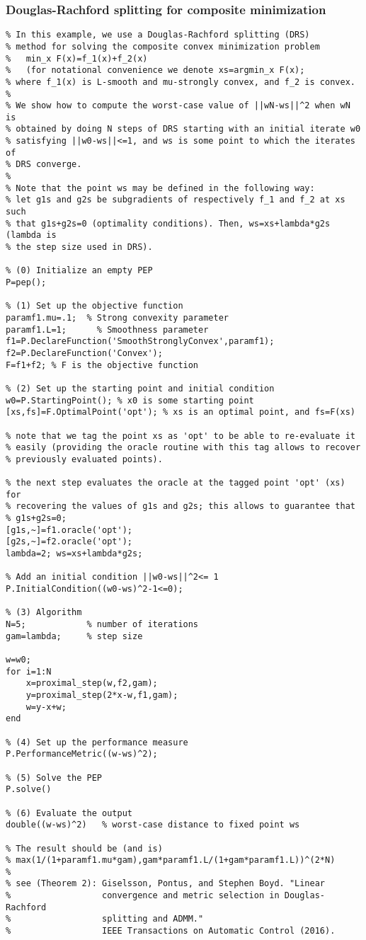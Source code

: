 \documentclass[11pt,a4paper]{article}
\begin{document}
\newpage
\subsubsection{Douglas-Rachford splitting for composite minimization}
\begin{lstlisting}
% In this example, we use a Douglas-Rachford splitting (DRS) 
% method for solving the composite convex minimization problem
%   min_x F(x)=f_1(x)+f_2(x) 
%   (for notational convenience we denote xs=argmin_x F(x);
% where f_1(x) is L-smooth and mu-strongly convex, and f_2 is convex.
%
% We show how to compute the worst-case value of ||wN-ws||^2 when wN is
% obtained by doing N steps of DRS starting with an initial iterate w0
% satisfying ||w0-ws||<=1, and ws is some point to which the iterates of
% DRS converge.
%
% Note that the point ws may be defined in the following way:
% let g1s and g2s be subgradients of respectively f_1 and f_2 at xs such 
% that g1s+g2s=0 (optimality conditions). Then, ws=xs+lambda*g2s (lambda is
% the step size used in DRS).

% (0) Initialize an empty PEP
P=pep();

% (1) Set up the objective function
paramf1.mu=.1;	% Strong convexity parameter
paramf1.L=1;      % Smoothness parameter
f1=P.DeclareFunction('SmoothStronglyConvex',paramf1);
f2=P.DeclareFunction('Convex');
F=f1+f2; % F is the objective function

% (2) Set up the starting point and initial condition
w0=P.StartingPoint(); % x0 is some starting point
[xs,fs]=F.OptimalPoint('opt'); % xs is an optimal point, and fs=F(xs)

% note that we tag the point xs as 'opt' to be able to re-evaluate it
% easily (providing the oracle routine with this tag allows to recover
% previously evaluated points).

% the next step evaluates the oracle at the tagged point 'opt' (xs) for
% recovering the values of g1s and g2s; this allows to guarantee that
% g1s+g2s=0;
[g1s,~]=f1.oracle('opt');
[g2s,~]=f2.oracle('opt');
lambda=2; ws=xs+lambda*g2s;

% Add an initial condition ||w0-ws||^2<= 1
P.InitialCondition((w0-ws)^2-1<=0); 

% (3) Algorithm
N=5;            % number of iterations
gam=lambda;		% step size

w=w0;
for i=1:N
    x=proximal_step(w,f2,gam);
    y=proximal_step(2*x-w,f1,gam);
    w=y-x+w;
end

% (4) Set up the performance measure
P.PerformanceMetric((w-ws)^2);

% (5) Solve the PEP
P.solve()

% (6) Evaluate the output
double((w-ws)^2)   % worst-case distance to fixed point ws

% The result should be (and is)
% max(1/(1+paramf1.mu*gam),gam*paramf1.L/(1+gam*paramf1.L))^(2*N) 
% 
% see (Theorem 2): Giselsson, Pontus, and Stephen Boyd. "Linear 
%                  convergence and metric selection in Douglas-Rachford
%                  splitting and ADMM."
%                  IEEE Transactions on Automatic Control (2016). 
\end{lstlisting}
\end{document}
